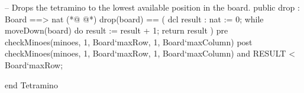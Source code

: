 \begin{vdmpp}[breaklines=true]
  -- Drops the tetramino to the lowest available position in the board.
  public drop : Board ==> nat
(*@
\label{drop:186}
@*)
  drop(board) == (
   dcl result : nat := 0;
   while moveDown(board) do 
    result := result + 1;
   return result
  )
  pre checkMinoes(minoes, 1, Board`maxRow, 1, Board`maxColumn)
  post checkMinoes(minoes, 1, Board`maxRow, 1, Board`maxColumn) 
   and RESULT < Board`maxRow;
  
end Tetramino
\end{vdmpp}

